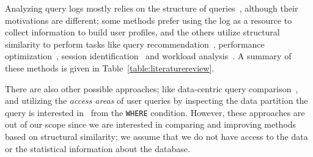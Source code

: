 
Analyzing query logs mostly relies on the structure of queries~\cite{Kamra2007SyntaxBased}, although their motivations are different; some methods prefer using the log as a resource to collect information to build user profiles, and the others utilize structural similarity to perform tasks like query recommendation~\cite{giacometti2009, yang2009, chatzopoulou2011querie}, performance optimization~\cite{aouiche2006},  session identification~\cite{aligon2014similarity} and workload analysis~\cite{makiyama2015text}.  A summary of these methods is given in Table~\ref{table:literaturereview}.

There are also other possible approaches; like data-centric query comparison~\cite{Mathew2010Raid}, and utilizing the \textit{access areas} of user queries by inspecting the data partition the query is interested in~\cite{nguyen2015identifying} from the \texttt{WHERE} condition.
However, these approaches are out of our scope
since we are interested in comparing and improving methods based on structural similarity; we assume that
we do not have access to the data or the statistical information about the database. 

